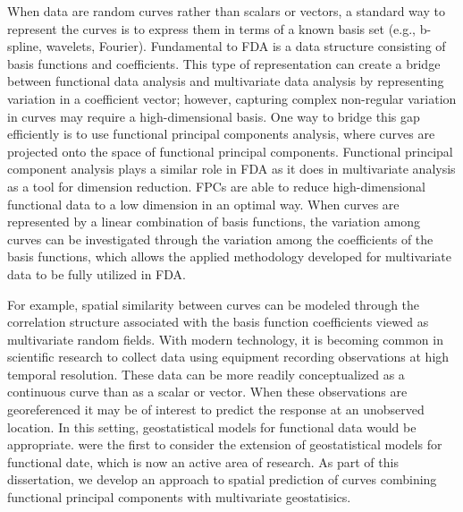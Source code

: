 When data are random curves rather than scalars or vectors, a standard way to represent the curves is to express them in terms of a known basis set (e.g., b-spline, wavelets, Fourier). Fundamental to FDA is a data structure consisting of basis functions and coefficients. This type of representation can create a bridge between functional data analysis and multivariate data analysis by representing variation in a coefficient vector; however, capturing complex non-regular variation in curves may require a high-dimensional basis. One way to bridge this gap efficiently is to use functional principal components analysis, where curves are projected onto the space of functional principal components. Functional principal component analysis plays a similar role in FDA as it does in multivariate analysis as a tool for dimension reduction. FPCs are able to reduce high-dimensional functional data to a low dimension in an optimal way. When curves are represented by a linear combination of basis functions, the variation among curves can be investigated through the variation among the coefficients of the basis functions, which allows the applied methodology developed for multivariate data to be fully utilized in FDA.

For example, spatial similarity between curves can be modeled through the correlation structure associated with the basis function coefficients viewed as multivariate random fields. With modern technology, it is becoming common in scientific research to collect data using equipment recording observations at high temporal resolution. These data can be more readily conceptualized as a continuous curve than as a scalar or vector. When these observations are georeferenced it may be of interest to predict the response at an unobserved location. In this setting, geostatistical models for functional data would be appropriate. \cite{Goulard:1993} were the first to consider the extension of geostatistical models for functional date, which is now an active area of research. As part of this dissertation, we develop an approach to spatial prediction of curves combining functional principal components with multivariate geostatisics. 
 
